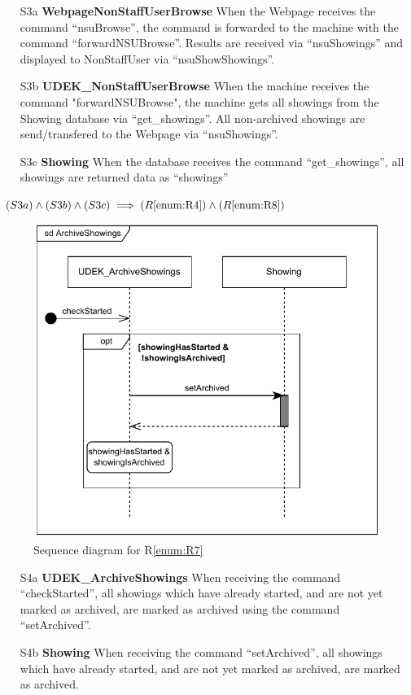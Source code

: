 \documentclass[a4paper,10pt,titlepage,bibtotoc,bibtotocnumbered]{scrreprt}
\begin{document}
\begin{itemize}
\item[S3a] \textbf{WebpageNonStaffUserBrowse}
When the Webpage receives the command ``nsuBrowse'', the command is forwarded to the machine with the command ``forwardNSUBrowse''.
Results are received via ``nsuShowings'' and displayed to NonStaffUser via ``nsuShowShowings''.

\item[S3b] \textbf{UDEK\_NonStaffUserBrowse}
When the machine receives the command "forwardNSUBrowse", the machine gets all showings from the Showing database via ``get\_showings''.
All non-archived showings are send/transfered to the Webpage via ``nsuShowings''.

\item[S3c] \textbf{Showing}
When the database receives the command ``get\_showings'', all showings are returned data as ``showings''

\end{itemize}

$(S3a) \land (S3b) \land (S3c) \implies (R\ref{enum:R4}) \land (R\ref{enum:R8})$

\begin{figure}[H]
\centering
\includegraphics{figures/05/a05_sequence_diagram_r07.pdf}
\caption{Sequence diagram for R\ref{enum:R7}}
\label{figure:sdR7}
\end{figure}

\begin{itemize}
\item[S4a] \textbf{UDEK\_ArchiveShowings}
When receiving the command ``checkStarted'', all showings which have already started, and are not yet marked as archived, are marked as archived using the command ``setArchived''.

\item[S4b] \textbf{Showing}
When receiving the command ``setArchived'', all showings which have already started, and are not yet marked as archived, are marked as archived.

\end{itemize}
\end{document}
